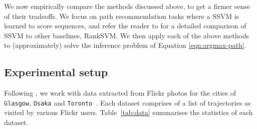 
We now empirically compare the methods discussed above,
to get a firmer sense of their tradeoffs.
We focus on path recommendation tasks where a SSVM is learned %
to score sequences, %
and refer the reader to \citet{Chen:2017} for a detailed comparison of SSVM to other baselines, \eg RankSVM.
We then apply %
each of the above methods to (approximately) solve the inference problem of Equation \ref{eqn:argmax-path}.

%
\subsection{Experimental setup}

Following \citet{cikm16paper,Chen:2017},
we work with
data
extracted from Flickr photos for the cities of {\tt Glasgow}, {\tt Osaka} and
{\tt Toronto}~\cite{ijcai15,cikm16paper}.
Each dataset comprises of a
list of trajectories as visited by various Flickr users. %
Table~\ref{tab:data} summarises the statistics of each dataset.


